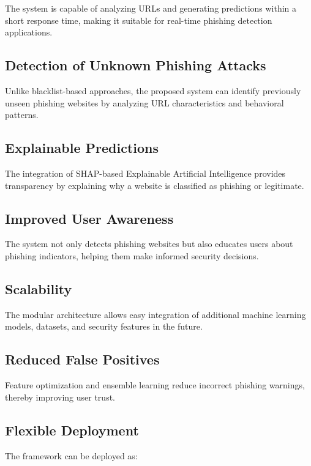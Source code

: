 \documentclass[12pt]{report}
\begin{document}
The system is capable of analyzing URLs and generating predictions within a short response time, making it suitable for real-time phishing detection applications.

\subsection{Detection of Unknown Phishing Attacks}

Unlike blacklist-based approaches, the proposed system can identify previously unseen phishing websites by analyzing URL characteristics and behavioral patterns.

\subsection{Explainable Predictions}

The integration of SHAP-based Explainable Artificial Intelligence provides transparency by explaining why a website is classified as phishing or legitimate.

\subsection{Improved User Awareness}

The system not only detects phishing websites but also educates users about phishing indicators, helping them make informed security decisions.

\subsection{Scalability}

The modular architecture allows easy integration of additional machine learning models, datasets, and security features in the future.

\subsection{Reduced False Positives}

Feature optimization and ensemble learning reduce incorrect phishing warnings, thereby improving user trust.

\subsection{Flexible Deployment}

The framework can be deployed as:
\end{document}
